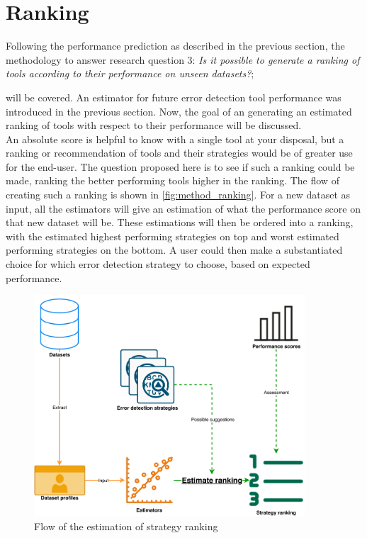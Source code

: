 \newpage
\section{Ranking}
\label{sec:toolranking}
% 
Following the performance prediction as described in the previous section, the methodology to answer research question 3: \textit{Is it possible to generate a ranking of tools according to their performance on unseen datasets?}; 

will be covered. An estimator for future error detection tool performance was introduced in the previous section. Now, the goal of an generating an estimated ranking of tools with respect to their performance will be discussed.
~\\An absolute score is helpful to know with a single tool at your disposal, but a ranking or recommendation of tools and their strategies would be of greater use for the end-user. The question proposed here is to see if such a ranking could be made, ranking the better performing tools higher in the ranking. 
The flow of creating such a ranking is shown in \autoref{fig:method_ranking}. For a new dataset as input, all the estimators will give an estimation of what the performance score on that new dataset will be. These estimations will then be ordered into a ranking, with the estimated highest performing strategies on top and worst estimated performing strategies on the bottom. A user could then make a substantiated choice for which error detection strategy to choose, based on expected performance.

\begin{figure}[h]
    \centering
    \includegraphics[width=0.9\textwidth]{thesis/Figures/Method/PerformanceEstimation-Ranking.pdf}
    \caption{Flow of the estimation of strategy ranking}
    \label{fig:method_ranking}
\end{figure}

